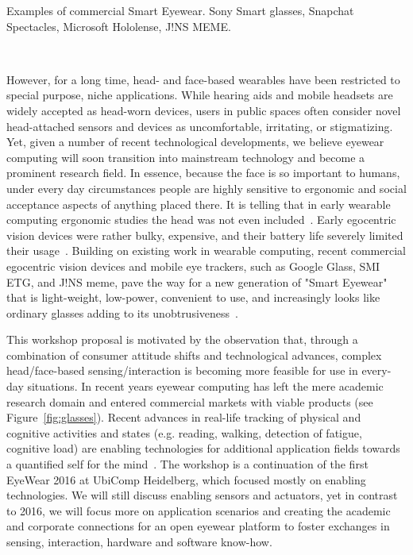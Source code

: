 \documentclass{sigchi-ext}
\begin{document}
\begin{marginfigure}[0pc]
\begin{minipage}{\marginparwidth}
  \caption{Examples of commercial Smart Eyewear. Sony Smart glasses, Snapchat Spectacles, Microsoft Hololense, J!NS MEME.}~\label{fig:glasses}
 \end{minipage}
\end{marginfigure} 

However, for a long time, head- and face-based wearables have been restricted to special purpose, niche applications.  While hearing aids and mobile headsets are widely accepted as head-worn devices, users in public spaces often consider novel head-attached sensors and devices as uncomfortable, irritating, or stigmatizing. Yet, given a number of recent technological developments, we believe eyewear computing will soon transition into mainstream technology and become a prominent research field. In essence, because the face is so important to humans, under every day circumstances people are highly sensitive to ergonomic and social acceptance aspects of anything placed there. It is telling that in early wearable computing ergonomic studies the head was not even included~\cite{bodine2003effects}. Early egocentric vision devices were rather bulky, expensive, and their battery life severely limited their usage~\cite{cakmakci2006head}. Building on existing work in wearable computing, recent commercial egocentric vision devices and mobile eye trackers, such as Google Glass, SMI ETG, and J!NS meme, pave the way for a new generation of "Smart Eyewear" that is light-weight, low-power, convenient to use, and increasingly looks like ordinary glasses adding to its unobtrusiveness~\cite{bulling2014cognition,kliegl2006tracking}.

This workshop proposal is motivated by the observation that, through a combination of consumer attitude shifts and technological advances, complex head/face-based sensing/interaction is becoming more feasible for use in every-day situations. In recent years eyewear computing has left the mere academic research domain and entered commercial markets with viable products (see Figure~\ref{fig:glasses}). Recent advances in real-life tracking of physical and cognitive activities and states (e.g. reading, walking, detection of fatigue, cognitive load) are enabling technologies for additional application fields towards a quantified self for the mind~\cite{kunze2015quantifying}.
The workshop is a continuation of the first EyeWear 2016 at UbiComp Heidelberg, which focused mostly on enabling technologies. We will still discuss enabling sensors and actuators, yet in contrast to 2016, we will focus more on application scenarios and creating the academic and corporate connections for an open eyewear platform to foster exchanges in sensing, interaction, hardware and software know-how.
\end{document}
